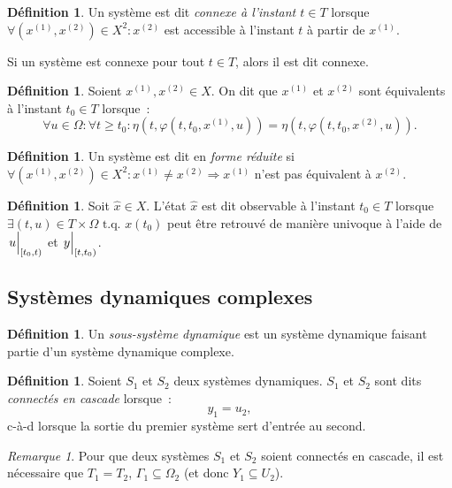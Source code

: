 \documentclass{article}
\theoremstyle{definition}
\newtheorem{déf}[thm]{Définition}
\theoremstyle{remark}
\newtheorem*{rmq}{Remarque}
\newcommand{\tq}{\text{ t.q. }}
\newcommand{\restr}[2]{\left.#1\vphantom{\big|}\right|_{#2}}
\begin{document}
	\begin{déf} Un système est dit \textit{connexe à l'instant $t \in T$} lorsque $\forall (x^{(1)}, x^{(2)}) \in X^2 : x^{(2)}$ est accessible à l'instant
	$t$ à partir de $x^{(1)}$.

	Si un système est connexe pour tout $t \in T$, alors il est dit connexe.
	\end{déf}

	\begin{déf} Soient $x^{(1)}, x^{(2)} \in X$. On dit que $x^{(1)}$ et $x^{(2)}$ sont équivalents à l'instant $t_0 \in T$ lorsque~:
	\[\forall u \in \Omega : \forall t \geq t_0 : \eta\left(t, \varphi\left(t, t_0, x^{(1)}, u\right)\right)
		= \eta\left(t, \varphi\left(t, t_0, x^{(2)}, u\right)\right).\]
	\end{déf}

	\begin{déf} Un système est dit en \textit{forme réduite} si $\forall (x^{(1)}, x^{(2)}) \in X^2 : x^{(1)} \neq x^{(2)} \Rightarrow x^{(1)}$ n'est pas
	équivalent à $x^{(2)}$.
	\end{déf}

	\begin{déf} Soit $\hat x \in X$. L'état $\hat x$ est dit observable à l'instant $t_0 \in T$ lorsque $\exists (t, u) \in T \times \Omega \tq x(t_0)$ peut
	être retrouvé de manière univoque à l'aide de $\restr u{[t_0, t)}$ et $\restr y{[t, t_0)}$.
	\end{déf}

	\subsection{Systèmes dynamiques complexes}

	\begin{déf} Un \textit{sous-système dynamique} est un système dynamique faisant partie d'un système dynamique complexe.
	\end{déf}

	\begin{déf} Soient $S_1$ et $S_2$ deux systèmes dynamiques. $S_1$ et $S_2$ sont dits \textit{connectés en cascade} lorsque~:
	\[y_1 = u_2,\]
	c-à-d lorsque la sortie du premier système sert d'entrée au second.
	\end{déf}

	\begin{rmq} Pour que deux systèmes $S_1$ et $S_2$ soient connectés en cascade, il est nécessaire que $T_1 = T_2$, $\Gamma_1 \subseteq \Omega_2$
	(et donc $Y_1 \subseteq U_2$).
	\end{rmq}
\end{document}
